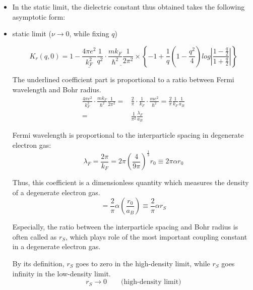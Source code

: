 \begin{itemize}
\item In the static limit, the dielectric constant thus obtained takes the following asymptotic form:
\item \begin{center}static limit ($\nu \rightarrow 0$, while fixing $q$)\end{center}

\begin{equation} \label{Eqs2.8.29}
K_r(q,0) = 1-\underline{\frac{4\pi e^2}{k_F^2}} \frac{1}{q^2} \cdot \underline{\frac{m k_F}{\hbar^2} \frac{1}{2\pi^2}} \times \left\{ -1 + \frac{1}{q}\left( 1-\frac{q^2}{4} \right)log\left| \frac{1-\frac{q}{2}}{1+\frac{q}{2}} \right| \right\}
\end{equation}

The underlined coefficient part is proportional to a ratio between Fermi wavelength and Bohr radius.
\begin{equation} \label{Eqs2.8.30} \begin{split}
\frac{4\pi e^2}{k_F^2}\cdot\frac{m k_F}{\hbar^2} \frac{1}{2\pi^2} =& \frac{2}{\pi}\cdot\frac{1}{k_F}\cdot\frac{m e^2}{\hbar^2} = \frac{2}{\pi} \frac{1}{k_F}\frac{1}{a_B}\\
=& \frac{1}{\pi^2}\frac{\lambda_F}{a_B}
\end{split}\end{equation}

Fermi wavelength is proportional to the interparticle spacing in degenerate electron gas:
\begin{equation} \label{Eqs2.8.31}
\lambda_F = \frac{2\pi}{k_F} = 2\pi \left( \frac{4}{9\pi} \right)^{\frac{1}{3}} r_0 \equiv 2\pi \alpha r_0
\end{equation}

Thus, this coefficient is a dimensionless quantity which measures the density of a degenerate electron gas.
\begin{equation} \label{Eqs2.8.32}
=\frac{2}{\pi} \alpha (\frac{r_0}{a_B}) \equiv \frac{2}{\pi} \alpha r_S
\end{equation}

Especially, the ratio between the interparticle spacing and Bohr radius is often called as $r_S$, which plays role of the most important coupling constant in a degenerate electron gas.

By its definition, $r_S$ goes to zero in the high-density limit, while $r_S$ goes infinity in the low-density limit.
\[ r_S \rightarrow 0 \qquad\text{(high-density limit)} \]


\end{itemize}
